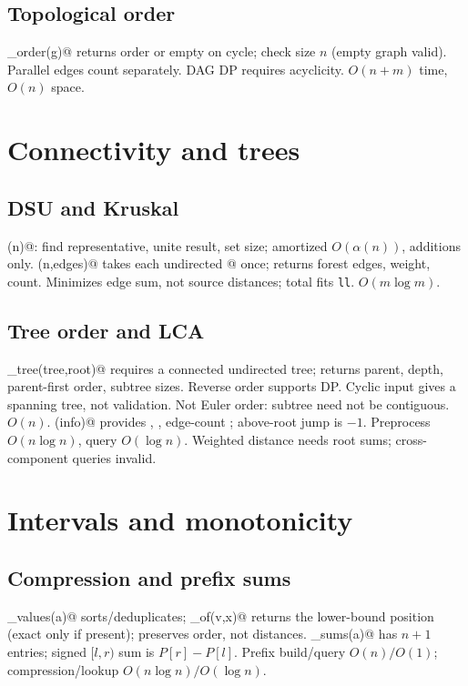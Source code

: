 \subsection{Topological order}
\verb@topological_order(g)@ returns order or empty on cycle; check size $n$
(empty graph valid). Parallel edges count separately. DAG DP requires
acyclicity. $O(n+m)$ time, $O(n)$ space.

\section{Connectivity and trees}
\subsection{DSU and Kruskal}
\verb@DSU(n)@: find representative, unite result, set size; amortized
$O(\alpha(n))$, additions only. \verb@kruskal(n,edges)@ takes each undirected
@ once; returns forest edges, weight, count. Minimizes edge
sum, not source distances; total fits \texttt{ll}. $O(m\log m)$.

\subsection{Tree order and LCA}
\verb@root_tree(tree,root)@ requires a connected undirected tree; returns
parent, depth, parent-first order, subtree sizes. Reverse order supports DP.
Cyclic input gives a spanning tree, not validation. Not Euler order: subtree
need not be contiguous. $O(n)$. \verb@LCA(info)@ provides \verb@jump@,
\verb@query@, edge-count \verb@distance@; above-root jump is $-1$.
Preprocess $O(n\log n)$, query $O(\log n)$. Weighted distance needs root
sums; cross-component queries invalid.

\section{Intervals and monotonicity}
\subsection{Compression and prefix sums}
\verb@compressed_values(a)@ sorts/deduplicates; \verb@rank_of(v,x)@ returns
the lower-bound position (exact only if present); preserves order, not
distances. \verb@prefix_sums(a)@ has $n+1$ entries; signed $[l,r)$ sum is
$P[r]-P[l]$. Prefix build/query $O(n)/O(1)$; compression/lookup
$O(n\log n)/O(\log n)$.

